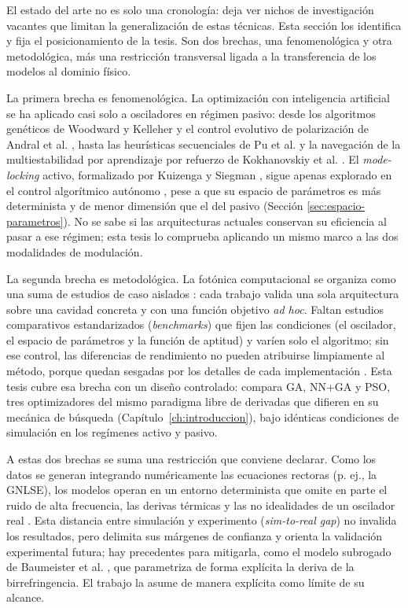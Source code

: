 El estado del arte no es solo una cronología: deja ver nichos de investigación vacantes que limitan la generalización de estas técnicas. Esta sección los identifica y fija el posicionamiento de la tesis. Son dos brechas, una fenomenológica y otra metodológica, más una restricción transversal ligada a la transferencia de los modelos al dominio físico.

La primera brecha es fenomenológica. La optimización con inteligencia artificial se ha aplicado casi solo a osciladores en régimen pasivo: desde los algoritmos genéticos de Woodward y Kelleher \cite{Woodward2016} y el control evolutivo de polarización de Andral et al. \cite{Andral2015}, hasta las heurísticas secuenciales de Pu et al. \cite{Pu2019} y la navegación de la multiestabilidad por aprendizaje por refuerzo de Kokhanovskiy et al. \cite{Kokhanovskiy2024}. El \emph{mode-locking} activo, formalizado por Kuizenga y Siegman \cite{KuizengaSiegman1970}, sigue apenas explorado en el control algorítmico autónomo \cite{Genty2021}, pese a que su espacio de parámetros es más determinista y de menor dimensión que el del pasivo (Sección \ref{sec:espacio-parametros}). No se sabe si las arquitecturas actuales conservan su eficiencia al pasar a ese régimen; esta tesis lo comprueba aplicando un mismo marco a las dos modalidades de modulación.

La segunda brecha es metodológica. La fotónica computacional se organiza como una suma de estudios de caso aislados \cite{Genty2021,Jiang2022}: cada trabajo valida una sola arquitectura sobre una cavidad concreta y con una función objetivo \textit{ad hoc}. Faltan estudios comparativos estandarizados (\emph{benchmarks}) que fijen las condiciones (el oscilador, el espacio de parámetros y la función de aptitud) y varíen solo el algoritmo; sin ese control, las diferencias de rendimiento no pueden atribuirse limpiamente al método, porque quedan sesgadas por los detalles de cada implementación \cite{Pineau2021}. Esta tesis cubre esa brecha con un diseño controlado: compara GA, NN+GA y PSO, tres optimizadores del mismo paradigma libre de derivadas que difieren en su mecánica de búsqueda (Capítulo~\ref{ch:introduccion}), bajo idénticas condiciones de simulación en los regímenes activo y pasivo.

A estas dos brechas se suma una restricción que conviene declarar. Como los datos se generan integrando numéricamente las ecuaciones rectoras (p. ej., la GNLSE), los modelos operan en un entorno determinista que omite en parte el ruido de alta frecuencia, las derivas térmicas y las no idealidades de un oscilador real \cite{Andral2015,Pu2019,Kokhanovskiy2024}. Esta distancia entre simulación y experimento (\emph{sim-to-real gap}) \cite{Zhao2020} no invalida los resultados, pero delimita sus márgenes de confianza y orienta la validación experimental futura; hay precedentes para mitigarla, como el modelo subrogado de Baumeister et al. \cite{Baumeister2018}, que parametriza de forma explícita la deriva de la birrefringencia. El trabajo la asume de manera explícita como límite de su alcance.

